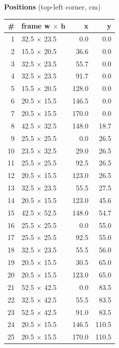 \documentclass[a4paper,landscape,10pt]{article}
\begin{document}
\begin{minipage}[t]{0.25\textwidth}
\vspace{8pt}
{\bfseries Positions} (top-left corner, cm)\\[2pt]
\tiny
\begin{tabular}{@{}r l r r@{}}
\toprule
\# & frame w $\times$ h & x & y \\
\midrule
1 & 32.5 $\times$ 23.5 & 0.0 & 0.0 \\
2 & 15.5 $\times$ 20.5 & 36.6 & 0.0 \\
3 & 32.5 $\times$ 23.5 & 55.7 & 0.0 \\
4 & 32.5 $\times$ 23.5 & 91.7 & 0.0 \\
5 & 15.5 $\times$ 20.5 & 128.0 & 0.0 \\
6 & 20.5 $\times$ 15.5 & 146.5 & 0.0 \\
7 & 20.5 $\times$ 15.5 & 170.0 & 0.0 \\
8 & 42.5 $\times$ 32.5 & 148.0 & 18.7 \\
9 & 25.5 $\times$ 25.5 & 0.0 & 26.5 \\
10 & 23.5 $\times$ 32.5 & 29.0 & 26.5 \\
11 & 25.5 $\times$ 25.5 & 92.5 & 26.5 \\
12 & 20.5 $\times$ 15.5 & 123.0 & 26.5 \\
13 & 32.5 $\times$ 23.5 & 55.5 & 27.5 \\
14 & 20.5 $\times$ 15.5 & 123.0 & 45.6 \\
15 & 42.5 $\times$ 52.5 & 148.0 & 54.7 \\
16 & 25.5 $\times$ 25.5 & 0.0 & 55.0 \\
17 & 25.5 $\times$ 25.5 & 92.5 & 55.0 \\
18 & 32.5 $\times$ 23.5 & 55.5 & 56.0 \\
19 & 20.5 $\times$ 15.5 & 30.5 & 65.0 \\
20 & 20.5 $\times$ 15.5 & 123.0 & 65.0 \\
21 & 52.5 $\times$ 42.5 & 0.0 & 83.5 \\
22 & 32.5 $\times$ 42.5 & 55.5 & 83.5 \\
23 & 52.5 $\times$ 42.5 & 91.0 & 83.5 \\
24 & 20.5 $\times$ 15.5 & 146.5 & 110.5 \\
25 & 20.5 $\times$ 15.5 & 170.0 & 110.5 \\
\bottomrule
\end{tabular}
\end{minipage}
\clearpage
\end{document}
